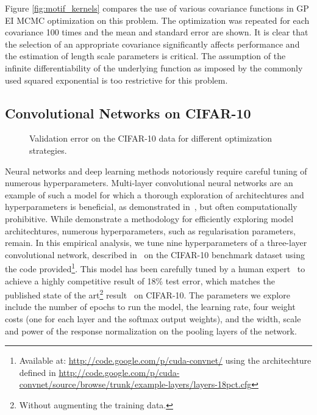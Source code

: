 \documentclass[aos,preprint]{imsart}
\begin{document}
Figure \ref{fig:motif_kernels} compares the use of various covariance
functions in GP EI MCMC optimization on this problem.  The
optimization was repeated for each covariance 100 times and the mean
and standard error are shown.  It is clear that the selection of an
appropriate covariance significantly affects performance and the
estimation of length scale parameters is critical.  The assumption of
the infinite differentiability of the underlying function as imposed
by the commonly used squared exponential is too restrictive for this
problem.

\subsection{Convolutional Networks on CIFAR-10}
\begin{figure}[ht]
\begin{center}
\end{center}
\caption{Validation error on the CIFAR-10 data for different optimization strategies.}
\label{fig:convnet}
\end{figure}

Neural networks and deep learning methods notoriously require careful
tuning of numerous hyperparameters.  Multi-layer convolutional neural
networks are an example of such a model for which a thorough
exploration of architechtures and hyperparameters is beneficial, as
demonstrated in~\citet{Saxe-etal-2011}, but often computationally
prohibitive.  While \citet{Saxe-etal-2011} demonstrate a methodology
for efficiently exploring model architechtures, numerous
hyperparameters, such as regularisation parameters, remain. In this
empirical analysis, we tune nine hyperparameters of a three-layer
convolutional network, described in~\citet{Krizhevsky-2009a} on the
CIFAR-10 benchmark dataset using the code provided\footnote{Available
  at: \url{http://code.google.com/p/cuda-convnet/} using the architechture
  defined in
  \url{http://code.google.com/p/cuda-convnet/source/browse/trunk/example-layers/layers-18pct.cfg}}.
This model has been carefully tuned by a human
expert~\citep{Krizhevsky-2009a} to achieve a highly competitive result
of 18\% test error, which matches the published state of the
art\footnote{Without augmenting the training data.}
result~\citep{Coates-2011a} on CIFAR-10. The parameters we explore
include the number of epochs to run the model, the learning rate, four
weight costs (one for each layer and the softmax output weights), and
the width, scale and power of the response normalization on the
pooling layers of the network.
\end{document}
